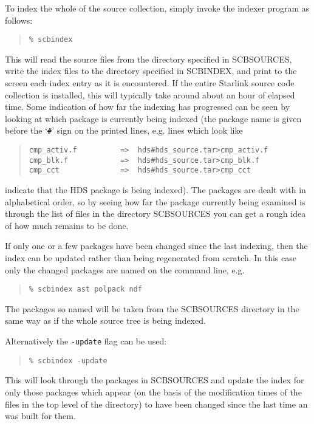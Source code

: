 \documentclass[twoside,11pt]{article}
\renewcommand{\_}{\texttt{\symbol{95}}}
\begin{document}
To index the whole of the source collection, simply invoke the
indexer program as follows:
\begin{quote}
\begin{verbatim}
% scbindex
\end{verbatim}
\end{quote}
This will
read the source files from the directory specified in SCB\_SOURCES,
write the index files to the directory specified in SCB\_INDEX,
and print to the screen each index entry as it is encountered.
If the entire Starlink source code collection is installed,
this will typically take around about an hour of elapsed time.
Some indication of how far the indexing
has progressed can be seen by looking at which package is currently
being indexed (the package name is given before the `{\tt \#}' sign on the
printed lines, e.g. lines which look like
\begin{quote}
\begin{verbatim}
cmp_activ.f          =>  hds#hds_source.tar>cmp_activ.f
cmp_blk.f            =>  hds#hds_source.tar>cmp_blk.f
cmp_cct              =>  hds#hds_source.tar>cmp_cct
\end{verbatim}
\end{quote}
indicate that the HDS package is being indexed).
The packages are dealt with in alphabetical order, so by seeing how
far the package currently being examined is through the list of files
in the directory SCB\_SOURCES you can get a rough idea of how much remains
to be done.

If only one or a few packages have been changed
since the last indexing,
then the index can be updated rather than being regenerated from scratch.
In this case only the changed packages are named on the command line,
e.g.
\begin{quote}
\begin{verbatim}
% scbindex ast polpack ndf
\end{verbatim}
\end{quote}
The packages so named will be taken from the SCB\_SOURCES directory in
the same way as if the whole source tree is being indexed.

Alternatively the {\tt -update} flag can be used:
\begin{quote}
\begin{verbatim}
% scbindex -update
\end{verbatim}
\end{quote}
This will look through the packages in SCB\_SOURCES and update the index
for only those packages which appear (on the basis of the modification
times of the files in the top level of the directory) to have been
changed since the last time an was built for them.
\end{document}
